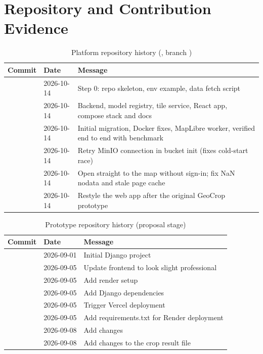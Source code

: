 \chapter{Repository and Contribution Evidence}\label{app:repo}
\begin{table}[htbp]
\centering\small
\caption[Platform repository history (geocrop-platform, branch main)]{Platform repository history (, branch )}
\label{tab:commits}
\begin{tabularx}{\textwidth}{L{1.8cm} L{1.9cm} Y}
\toprule
\textbf{Commit} & \textbf{Date} & \textbf{Message}\\
\midrule
{} & 2026-10-14 & Step 0: repo skeleton, env example, data fetch script\\
 & 2026-10-14 & Backend, model registry, tile service, React app, compose stack and docs\\
 & 2026-10-14 & Initial migration, Docker fixes, MapLibre worker, verified end to end with benchmark\\
 & 2026-10-14 & Retry MinIO connection in bucket init (fixes cold-start race)\\
 & 2026-10-14 & Open straight to the map without sign-in; fix NaN nodata and stale page cache\\
 & 2026-10-14 & Restyle the web app after the original GeoCrop prototype\\
\bottomrule
\end{tabularx}
\end{table}

\begin{table}[htbp]
\centering\small
\caption{Prototype repository history (proposal stage)}
\label{tab:protocommits}
\begin{tabularx}{\textwidth}{L{1.8cm} L{1.9cm} Y}
\toprule
\textbf{Commit} & \textbf{Date} & \textbf{Message}\\
\midrule
{} & 2026-09-01 & Initial Django project\\
 & 2026-09-05 & Update frontend to look slight professional\\
 & 2026-09-05 & Add render setup\\
 & 2026-09-05 & Add Django dependencies\\
 & 2026-09-05 & Trigger Vercel deployment\\
 & 2026-09-05 & Add requirements.txt for Render deployment\\
 & 2026-09-08 & Add changes\\
 & 2026-09-08 & Add changes to the crop result file\\
\bottomrule
\end{tabularx}
\end{table}


